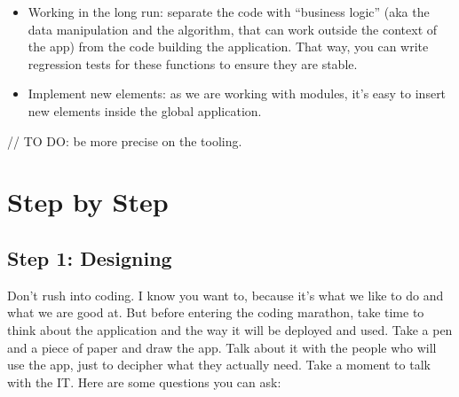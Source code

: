 \documentclass[]{book}
\providecommand{\tightlist}{%
  \setlength{\itemsep}{0pt}\setlength{\parskip}{0pt}}
\begin{document}
\begin{itemize}
\tightlist
\item
  Working in the long run: separate the code with ``business logic'' (aka the data manipulation and the algorithm, that can work outside the context of the app) from the code building the application. That way, you can write regression tests for these functions to ensure they are stable.
\item
  Implement new elements: as we are working with modules, it's easy to insert new elements inside the global application.
\end{itemize}

// TO DO: be more precise on the tooling.

\hypertarget{part-step-by-step}{%
\part{Step by Step}\label{part-step-by-step}}

\hypertarget{step-design}{%
\chapter{Step 1: Designing}\label{step-design}}

Don't rush into coding. I know you want to, because it's what we like to do and what we are good at. But before entering the coding marathon, take time to think about the application and the way it will be deployed and used. Take a pen and a piece of paper and draw the app. Talk about it with the people who will use the app, just to decipher what they actually need. Take a moment to talk with the IT. Here are some questions you can ask:
\end{document}
